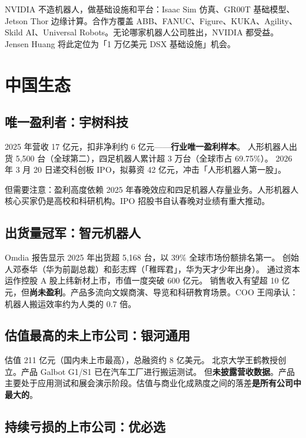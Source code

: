 NVIDIA 不造机器人，做基础设施和平台\cite{nvidia2026gtc}：Isaac Sim 仿真、GR00T 基础模型、Jetson Thor 边缘计算。合作方覆盖 ABB、FANUC、Figure、KUKA、Agility、Skild AI、Universal Robots。无论哪家机器人公司胜出，NVIDIA 都受益。Jensen Huang 将此定位为「1 万亿美元 DSX 基础设施」机会。

\section{中国生态}

\subsection{唯一盈利者：宇树科技}

2025 年营收 17 亿元，扣非净利约 6 亿元——\textbf{行业唯一盈利样本}\cite{unitree2026ipo}。
人形机器人出货 5,500 台（全球第二），四足机器人累计超 3 万台（全球市占 69.75\%）。
2026 年 3 月 20 日递交科创板 IPO，拟募资 42 亿元，冲击「人形机器人第一股」。

但需要注意：盈利高度依赖 2025 年春晚效应和四足机器人存量业务。人形机器人核心买家仍是高校和科研机构。IPO 招股书自认春晚对业绩有重大推动\cite{unitree2026ipo}。

\subsection{出货量冠军：智元机器人}

Omdia 报告显示 2025 年出货超 5,168 台，以 39\% 全球市场份额排名第一\cite{agibot2025omdia}。
创始人邓泰华（华为前副总裁）和彭志辉（「稚晖君」，华为天才少年出身）。
通过资本运作控股 A 股上纬新材上市，市值一度突破 600 亿元\cite{agibot2025listing}。
销售收入有望超 10 亿元，但\textbf{尚未盈利}。产品多流向文娱商演、导览和科研教育场景。COO 王闯承认：机器人搬运效率约为人类的 0.7 倍。

\subsection{估值最高的未上市公司：银河通用}

估值 211 亿元（国内未上市最高），总融资约 8 亿美元\cite{galbot2026aplus}。
北京大学王鹤教授创立。产品 Galbot G1/S1 已在汽车工厂进行搬运测试。
但\textbf{未披露营收数据}。产品主要处于应用测试和展会演示阶段。估值与商业化成熟度之间的落差\textbf{是所有公司中最大的}。

\subsection{持续亏损的上市公司：优必选}

